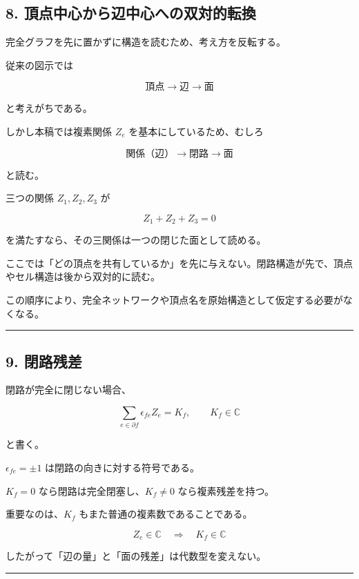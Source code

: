 \documentclass[
  a4paper,
]{ltjsarticle}
\begin{document}
\subsection{8.
頂点中心から辺中心への双対的転換}\label{ux9802ux70b9ux4e2dux5fc3ux304bux3089ux8fbaux4e2dux5fc3ux3078ux306eux53ccux5bfeux7684ux8ee2ux63db}

完全グラフを先に置かずに構造を読むため、考え方を反転する。

従来の図示では

\[
\text{頂点}\to\text{辺}\to\text{面}
\]

と考えがちである。

しかし本稿では複素関係 \(Z_e\) を基本にしているため、むしろ

\[
\boxed{\text{関係（辺）}\to\text{閉路}\to\text{面}}
\]

と読む。

三つの関係 \(Z_1,Z_2,Z_3\) が

\[
Z_1+Z_2+Z_3=0
\]

を満たすなら、その三関係は一つの閉じた面として読める。

ここでは「どの頂点を共有しているか」を先に与えない。閉路構造が先で、頂点やセル構造は後から双対的に読む。

この順序により、完全ネットワークや頂点名を原始構造として仮定する必要がなくなる。

\begin{center}\rule{0.5\linewidth}{0.5pt}\end{center}

\subsection{9. 閉路残差}\label{ux9589ux8defux6b8bux5dee}

閉路が完全に閉じない場合、

\[
\boxed{\sum_{e\in\partial f}\epsilon_{fe}Z_e=K_f},\qquad K_f\in\mathbb C
\]

と書く。

\(\epsilon_{fe}=\pm1\) は閉路の向きに対する符号である。

\(K_f=0\) なら閉路は完全閉塞し、\(K_f\neq0\) なら複素残差を持つ。

重要なのは、\(K_f\) もまた普通の複素数であることである。

\[
\boxed{Z_e\in\mathbb C\quad\Rightarrow\quad K_f\in\mathbb C}
\]

したがって「辺の量」と「面の残差」は代数型を変えない。

\begin{center}\rule{0.5\linewidth}{0.5pt}\end{center}
\end{document}
